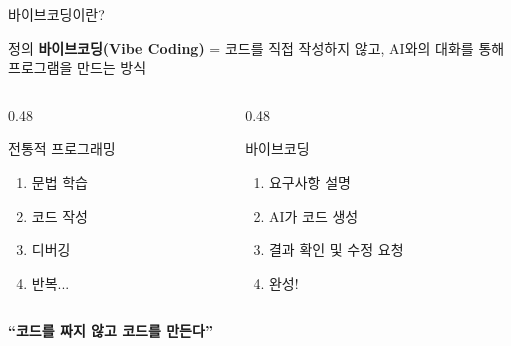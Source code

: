 \documentclass[aspectratio=169, 11pt]{beamer}
\begin{document}
\begin{frame}{바이브코딩이란?}
\begin{block}{정의}
\textbf{바이브코딩(Vibe Coding)} = 코드를 직접 작성하지 않고, AI와의 대화를 통해 프로그램을 만드는 방식
\end{block}

\vspace{0.3em}

\begin{columns}[T, totalwidth=\textwidth]
\begin{column}{0.48\textwidth}
\begin{alertblock}{전통적 프로그래밍}
\begin{enumerate}
    \item 문법 학습
    \item 코드 작성
    \item 디버깅
    \item 반복...
\end{enumerate}
\end{alertblock}
\end{column}
\hfill
\begin{column}{0.48\textwidth}
\begin{exampleblock}{바이브코딩}
\begin{enumerate}
    \item 요구사항 설명
    \item AI가 코드 생성
    \item 결과 확인 및 수정 요청
    \item 완성!
\end{enumerate}
\end{exampleblock}
\end{column}
\end{columns}

\vspace{0.3em}

\begin{center}
\large\bfseries\color{MainBlue}
``코드를 짜지 않고 코드를 만든다''
\end{center}
\end{frame}
\end{document}
